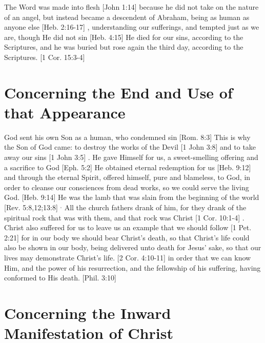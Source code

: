 \documentclass[../main.tex] {subfiles}
\begin{document}
	The Word was made into flesh [John 1:14]  because he did not take on the nature of an angel, but instead became a descendent of Abraham, being as human as anyone else [Heb. 2:16-17] , understanding our sufferings, and tempted just as we are, though He did not sin [Heb. 4:15]  He died for our sins, according to the Scriptures, and he was buried but rose again the third day, according to the Scriptures. [1 Cor. 15:3-4] 

	\section{Concerning the End and Use of that Appearance}

	God sent his own Son as a human, who condemned sin [Rom. 8:3]  This is why the Son of God came: to destroy the works of the Devil [1 John 3:8]  and to take away our sins [1 John 3:5] . He gave Himself for us, a sweet-smelling offering and a sacrifice to God [Eph. 5:2]  He obtained eternal redemption for us [Heb. 9:12]  and through the eternal Spirit, offered himself, pure and blameless, to God, in order to cleanse our consciences from dead works, so we could serve the living God. [Heb. 9:14]  He was the lamb that was slain from the beginning of the world [Rev. 5:8,12;13:8] $^{,}$ All the church fathers drank of him, for they drank of the spiritual rock that was with them, and that rock was Christ [1 Cor. 10:1-4] . Christ also suffered for us to leave us an example that we should follow [1 Pet. 2:21]  for in our body we should bear Christ's death, so that Christ's life could also be shown in our body, being delivered unto death for Jesus' sake,  so that our lives may demonstrate Christ's life. [2 Cor. 4:10-11]  in order that we can know Him, and the power of his resurrection, and the fellowship of his suffering, having conformed to His death. [Phil. 3:10] 

	\section{Concerning the Inward Manifestation of Christ}
\end{document}
